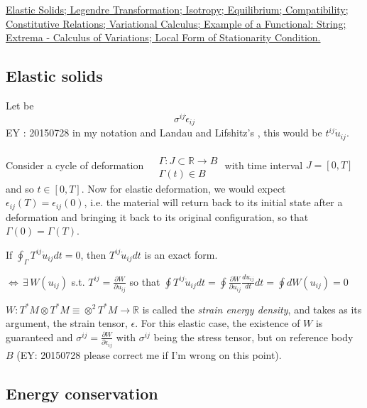 \documentclass[twoside,landscape,10pt]{amsart}
\theoremstyle{plain}
\theoremstyle{definition}
\theoremstyle{remark}
\begin{document}
\begin{multicols*}{2}
\href{http://ocw.mit.edu/courses/aeronautics-and-astronautics/16-225-computational-mechanics-of-materials-fall-2003/lecture-notes/lecture_01.pdf}{Elastic Solids; Legendre Transformation; Isotropy; Equilibrium; Compatibility; Constitutive Relations; Variational Calculus; Example of a Functional: String; Extrema - Calculus of Variations; Local Form of Stationarity Condition.}   

\subsection{Elastic solids}

Let  be 
\[
\sigma^{ij} \dot{\epsilon}_{ij}
\]
EY : 20150728 in my notation and Landau and Lifshitz's \cite{LLandauELifshitz1970}, this would be $t^{ij} \dot{u}_{ij}$.  

Consider a cycle of deformation $\begin{aligned} & \quad \\
  & \Gamma:J \subset \mathbb{R} \to B \\ & \Gamma(t) \in B \end{aligned}$ with time interval $J = [0,T]$ and so $t\in [0,T]$.  Now for elastic deformation, we would expect $\epsilon_{ij}(T) = \epsilon_{ij}(0)$, i.e. the material will return back to its initial state after a deformation and bringing it back to its original configuration, so that $\Gamma(0) = \Gamma(T)$.  

If $\oint_{\Gamma} T^{ij} \dot{u}_{ij} dt= 0$, then $T^{ij}\dot{u}_{ij} dt$ is an exact form.  

$\Longleftrightarrow \, \exists \, W(u_{ij})$ s.t. $T^{ij} = \frac{ \partial W}{ \partial u_{ij}}$ so that $\oint T^{ij} \dot{u}_{ij} dt = \oint \frac{ \partial W}{ \partial u_{ij}} \frac{du_{ij}}{dt} dt = \oint dW(u_{ij}) = 0 $

$W: T^*M \otimes T^*M \equiv \otimes^2 T^*M \to \mathbb{R}$ is called the \emph{strain energy density}, and takes as its argument, the strain tensor, $\epsilon$.  For this elastic case, the existence of $W$ is guaranteed and $\sigma^{ij} = \frac{ \partial W}{ \partial \epsilon_{ij}}$ with $\sigma^{ij}$ being the stress tensor, but on reference body $B$ (EY: 20150728 please correct me if I'm wrong on this point).  



\subsection{Energy conservation}


\end{multicols*}
\end{document}
